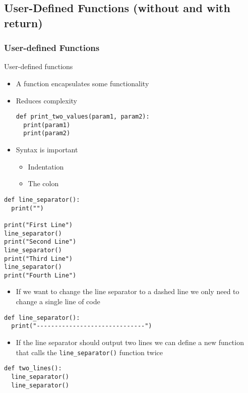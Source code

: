 \documentclass[10pt, a4paper]{beamer} %
\begin{document}
\subsection{User-Defined Functions (without and with return)} %
\begin{frame}\frametitle{User-defined Functions}
	\begin{block}{User-defined functions}
		\begin{itemize}
			\item A function encapsulates some functionality
			\item Reduces complexity
			      \begin{lstlisting}
def print_two_values(param1, param2):
  print(param1)
  print(param2)
    \end{lstlisting}
			\item Syntax is important
			      \begin{itemize}
				      \item Indentation
				      \item The colon
			      \end{itemize}
		\end{itemize}
	\end{block}
	\framebreak
	\begin{examples}
		\begin{lstlisting}
def line_separator():
  print("")

print("First Line")
line_separator()
print("Second Line")
line_separator()
print("Third Line")
line_separator()
print("Fourth Line")
\end{lstlisting}
	\end{examples}
	\begin{itemize}
		\item If we want to change the line separator to a dashed line we only need to change a single line of code
	\end{itemize}
	\begin{lstlisting}
def line_separator():
  print("------------------------------")
\end{lstlisting}


	\framebreak

	\begin{examples}
		\begin{itemize}
			\item If the line separator should output two lines we can define a new function that calls the \lstinline!line_separator()! function twice
		\end{itemize}
		\begin{lstlisting}
def two_lines():
  line_separator()
  line_separator()


\end{lstlisting}
\end{examples}
\end{frame}
\end{document}
